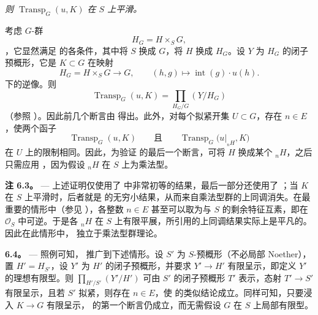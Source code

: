 \textit{则 \(\operatorname{Transp}_G(u,K)\) 在 \(S\) 上平滑。}

考虑 \(G\)-群  \[
  H_G=H\times_SG,
\]，它显然满足  的各条件，其中将 \(S\) 换成 \(G\)，将 \(H\) 换成 \(H_G\)。设 \(Y\) 为 \(H_G\) 的闭子预概形，它是 \(K\subset G\) 在映射  \[
  H_G=H\times_SG\longrightarrow G,\qquad
  (h,g)\longmapsto\operatorname{int}(g)\cdot u(h).
\] 下的逆像。则  \[
  \operatorname{Transp}_G(u,K)
  =
  \prod_{H_G/G}(Y/H_G)
\]（参照 ）。因此前几个断言由  得出。此外，对每个拟紧开集 \(U\subset G\)，存在 \(n\in E\)，使两个函子  \[
  \operatorname{Transp}_G(u,K)
  \qquad\text{且}\qquad
  \operatorname{Transp}_G\bigl(u|_{{}_nH},K\bigr)
\] 在 \(U\) 上的限制相同。因此，为验证  的最后一个断言，可将 \(H\) 换成某个 \({}_nH\)，之后只需应用 ，因为假设 \({}_nH\) 在 \(S\) 上为乘法型。

\medskip\noindent{}\textbf{注 6.3。} --- 上述证明仅使用了  中非常初等的结果，最后一部分还使用了 ；当 \(K\) 在 \(S\) 上平滑时，后者就是  的无穷小结果，从而来自乘法型群的上同调消失。在最重要的情形中（参见 ），各整数 \(n\in E\) 甚至可以取为与 \(S\) 的剩余特征互素，即在 \(\mathscr O_S\) 中可逆。于是各 \({}_nH\) 在 \(S\) 上有限平展，所引用的上同调结果实际上是平凡的。因此在此情形中， 独立于乘法型群理论。

\medskip\noindent{}\textbf{6.4。} --- 照例可知， 推广到下述情形。设 \(S'\) 为 \(S\)-预概形（不必局部 Noether），置 \(H'=H_{S'}\)，设 \(Y'\) 为 \(H'\) 的闭子预概形，并要求 \(Y'\to H'\) 有限呈示，即定义 \(Y'\) 的理想有限型。则 \(\prod_{H'/S'}(Y'/H')\) 可由 \(S'\) 的闭子预概形 \(T'\) 表示，态射 \(T'\to S'\) 有限呈示，且若 \(S'\) 拟紧，则存在 \(n\in E\)，使  的类似结论成立。同样可知，只要浸入 \(K\to G\) 有限呈示， 的第一个断言仍成立，而无需假设 \(G\) 在 \(S\) 上局部有限型。

